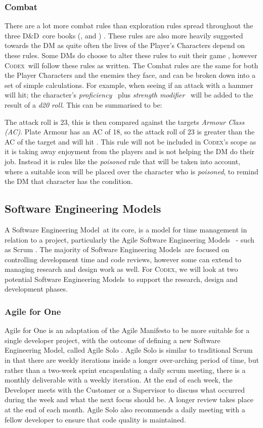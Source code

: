 \documentclass[final]{cmpreport}
\newcommand{\dnd}{D\&D}
\newcommand{\sem}{Software Engineering Model}
\newcommand{\sems}{Software Engineering Models}
\newcommand{\Codex}{\textsc{Codex}}
\begin{document}
	\subsubsection{Combat} \label{DnDCombat}
	There are a lot more combat rules than exploration rules spread throughout the three \dnd \ core books (\cite{DMGuide}, \cite{MonsterManual} and \cite{PlayerHandbook}) . These rules are also more heavily suggested towards the DM as quite often the lives of the Player's Characters depend on these rules. Some DMs do choose to alter these rules to suit their game \citep{Personal}, however \Codex \ will follow these rules as written. The Combat rules are the same for both the Player Characters and the enemies they face, and can be broken down into a set of simple calculations. For example, when seeing if an attack with a hammer will hit; the character's \emph{proficiency} \ plus \emph{strength modifier} \ will be added to the result of a \emph{d20 roll}. This can be summarised to be:

	The attack roll is 23, this is then compared against the targets \emph{Armour Class (AC)}. Plate Armour has an AC of 18, so the attack roll of 23 is greater than the AC of the target and will hit \citep{PlayerHandbook}. This rule will not be included in \Codex's scope as it is taking away enjoyment from the players and is not helping the DM do their job. Instead it is rules like the \emph{poisoned} rule that will be taken into account, where a suitable icon will be placed over the character who is \emph{poisoned}, to remind the DM that  character has the condition.
	
	\subsection{Software Engineering Models} \label{SEMLit}
	A \sem \ at its core, is a model for time management in relation to a project, particularly the Agile \sems \ \citep{AgileManifesto} - such as Scrum  \citep{Scrum} . The majority of \sems \ are focused on controlling development time and code reviews, however some can extend to managing research and design work as well. For \Codex, we will look at two potential \sems \ to support the research, design and development phases. 
	 
	\subsubsection{Agile for One}
	Agile for One is an adaptation of the Agile Manifesto to be more suitable for a single developer project, with the outcome of defining a new \sem , called Agile Solo \citep{AgileSolo}. Agile Solo is similar to traditional Scrum in that there are weekly iterations inside a longer over-arching period of time, but rather than a two-week sprint encapsulating a daily scrum meeting, there is a monthly deliverable with a weekly iteration. At the end of each week, the Developer meets with the Customer or a Supervisor to discuss what occurred during the week and what the next focus should be. A longer review takes place at the end of each month. Agile Solo also recommends a daily meeting with a fellow developer to ensure that code quality is maintained. 
	
\end{document}
